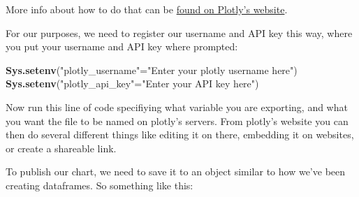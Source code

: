 \documentclass[
]{book}
\newenvironment{Shaded}{\begin{snugshade}}{\end{snugshade}}
\newcommand{\DataTypeTok}[1]{\textcolor[rgb]{0.13,0.29,0.53}{#1}}
\newcommand{\KeywordTok}[1]{\textcolor[rgb]{0.13,0.29,0.53}{\textbf{#1}}}
\newcommand{\NormalTok}[1]{#1}
\newcommand{\OperatorTok}[1]{\textcolor[rgb]{0.81,0.36,0.00}{\textbf{#1}}}
\newcommand{\StringTok}[1]{\textcolor[rgb]{0.31,0.60,0.02}{#1}}
\begin{document}
More info about how to do that can be \href{https://plot.ly/r/getting-started/\#initialization-for-online-plotting}{found on Plotly's website}.

For our purposes, we need to register our username and API key this way, where you put your username and API key where prompted:

\begin{Shaded}
\begin{Highlighting}[]
\KeywordTok{Sys.setenv}\NormalTok{(}\StringTok{"plotly_username"}\NormalTok{=}\StringTok{"Enter your plotly username here"}\NormalTok{)}
\KeywordTok{Sys.setenv}\NormalTok{(}\StringTok{"plotly_api_key"}\NormalTok{=}\StringTok{"Enter your API key here"}\NormalTok{)}
\end{Highlighting}
\end{Shaded}

Now run this line of code specifiying what variable you are exporting, and what you want the file to be named on plotly's servers. From plotly's website you can then do several different things like editing it on there, embedding it on websites, or create a shareable link.

To publish our chart, we need to save it to an object similar to how we've been creating dataframes. So something like this:

\begin{Shaded}
\end{Shaded}
\end{document}
